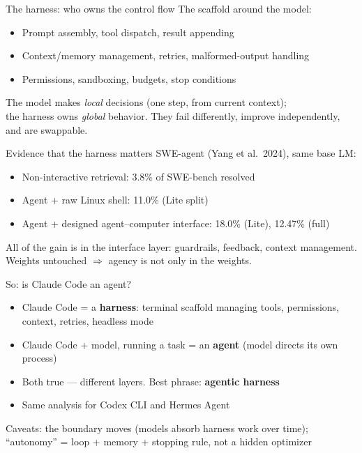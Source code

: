 \documentclass[aspectratio=169,11pt]{beamer}
\begin{document}
\begin{frame}{The harness: who owns the control flow}
The scaffold around the model:
\begin{itemize}
\item Prompt assembly, tool dispatch, result appending
\item Context/memory management, retries, malformed-output handling
\item Permissions, sandboxing, budgets, stop conditions
\end{itemize}
\vspace{0.4em}
The model makes \emph{local} decisions (one step, from current context);\\
the harness owns \emph{global} behavior. They fail differently, improve independently, and are swappable.
\end{frame}

\begin{frame}{Evidence that the harness matters}
SWE-agent (Yang et al.\ 2024), same base LM:
\begin{itemize}
\item Non-interactive retrieval: 3.8\% of SWE-bench resolved
\item Agent + raw Linux shell: 11.0\% (Lite split)
\item Agent + designed agent--computer interface: 18.0\% (Lite), 12.47\% (full)
\end{itemize}
\vspace{0.4em}
All of the gain is in the interface layer: guardrails, feedback, context management.\\
Weights untouched $\Rightarrow$ agency is not only in the weights.
\end{frame}

\begin{frame}{So: is Claude Code an agent?}
\begin{itemize}
\item Claude Code = a \textbf{harness}: terminal scaffold managing tools, permissions, context, retries, headless mode
\item Claude Code + model, running a task = an \textbf{agent} (model directs its own process)
\item Both true --- different layers. Best phrase: \textbf{agentic harness}
\item Same analysis for Codex CLI and Hermes Agent
\end{itemize}
\vspace{0.4em}
Caveats: the boundary moves (models absorb harness work over time);\\``autonomy'' = loop + memory + stopping rule, not a hidden optimizer
\end{frame}
\end{document}
